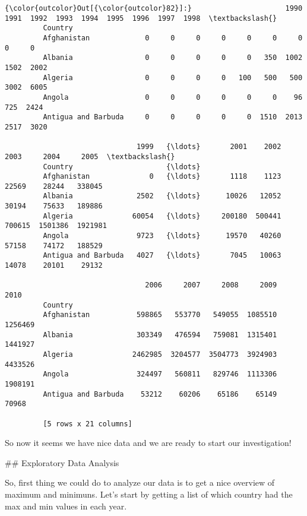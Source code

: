 \documentclass[11pt]{article}
\begin{document}
\begin{Verbatim}[commandchars=\\\{\}]
{\color{outcolor}Out[{\color{outcolor}82}]:}                      1990  1991  1992  1993  1994  1995  1996  1997  1998  \textbackslash{}
         Country                                                                     
         Afghanistan             0     0     0     0     0     0     0     0     0   
         Albania                 0     0     0     0     0   350  1002  1502  2002   
         Algeria                 0     0     0     0   100   500   500  3002  6005   
         Angola                  0     0     0     0     0     0    96   725  2424   
         Antigua and Barbuda     0     0     0     0     0  1510  2013  2517  3020   
         
                               1999   {\ldots}       2001    2002    2003     2004     2005  \textbackslash{}
         Country                      {\ldots}                                                
         Afghanistan              0   {\ldots}       1118    1123   22569    28244   338045   
         Albania               2502   {\ldots}      10026   12052   30194    75633   189886   
         Algeria              60054   {\ldots}     200180  500441  700615  1501386  1921981   
         Angola                9723   {\ldots}      19570   40260   57158    74172   188529   
         Antigua and Barbuda   4027   {\ldots}       7045   10063   14078    20101    29132   
         
                                 2006     2007     2008     2009     2010  
         Country                                                           
         Afghanistan           598865   553770   549055  1085510  1256469  
         Albania               303349   476594   759081  1315401  1441927  
         Algeria              2462985  3204577  3504773  3924903  4433526  
         Angola                324497   560811   829746  1113306  1908191  
         Antigua and Barbuda    53212    60206    65186    65149    70968  
         
         [5 rows x 21 columns]
\end{Verbatim}
            
    So now it seems we have nice data and we are ready to start our
investigation!

     \#\# Exploratory Data Analysis

So, first thing we could do to analyze our data is to get a nice
overview of maximum and minimuns. Let's start by getting a list of which
country had the max and min values in each year.
\end{document}
